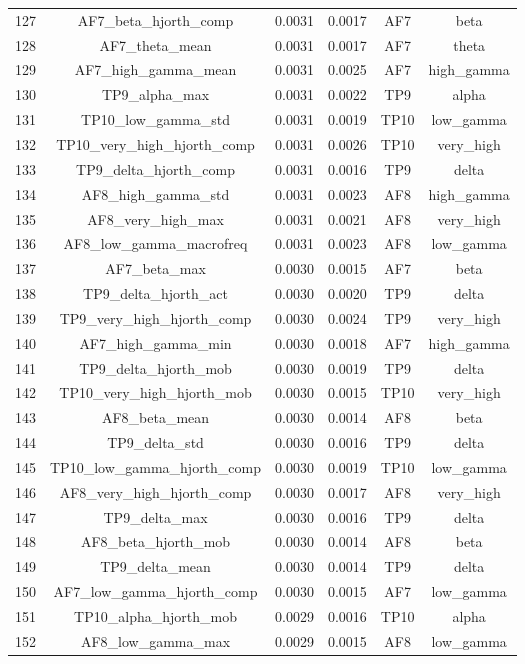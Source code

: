 \begin{table}[hptb]
\begin{table}
\begin{tabular}{cccccc}
127 & AF7_beta_hjorth_comp & 0.0031 & 0.0017 & AF7 & beta \\
128 & AF7_theta_mean & 0.0031 & 0.0017 & AF7 & theta \\
129 & AF7_high_gamma_mean & 0.0031 & 0.0025 & AF7 & high_gamma \\
130 & TP9_alpha_max & 0.0031 & 0.0022 & TP9 & alpha \\
131 & TP10_low_gamma_std & 0.0031 & 0.0019 & TP10 & low_gamma \\
132 & TP10_very_high_hjorth_comp & 0.0031 & 0.0026 & TP10 & very_high \\
133 & TP9_delta_hjorth_comp & 0.0031 & 0.0016 & TP9 & delta \\
134 & AF8_high_gamma_std & 0.0031 & 0.0023 & AF8 & high_gamma \\
135 & AF8_very_high_max & 0.0031 & 0.0021 & AF8 & very_high \\
136 & AF8_low_gamma_macrofreq & 0.0031 & 0.0023 & AF8 & low_gamma \\
137 & AF7_beta_max & 0.0030 & 0.0015 & AF7 & beta \\
138 & TP9_delta_hjorth_act & 0.0030 & 0.0020 & TP9 & delta \\
139 & TP9_very_high_hjorth_comp & 0.0030 & 0.0024 & TP9 & very_high \\
140 & AF7_high_gamma_min & 0.0030 & 0.0018 & AF7 & high_gamma \\
141 & TP9_delta_hjorth_mob & 0.0030 & 0.0019 & TP9 & delta \\
142 & TP10_very_high_hjorth_mob & 0.0030 & 0.0015 & TP10 & very_high \\
143 & AF8_beta_mean & 0.0030 & 0.0014 & AF8 & beta \\
144 & TP9_delta_std & 0.0030 & 0.0016 & TP9 & delta \\
145 & TP10_low_gamma_hjorth_comp & 0.0030 & 0.0019 & TP10 & low_gamma \\
146 & AF8_very_high_hjorth_comp & 0.0030 & 0.0017 & AF8 & very_high \\
147 & TP9_delta_max & 0.0030 & 0.0016 & TP9 & delta \\
148 & AF8_beta_hjorth_mob & 0.0030 & 0.0014 & AF8 & beta \\
149 & TP9_delta_mean & 0.0030 & 0.0014 & TP9 & delta \\
150 & AF7_low_gamma_hjorth_comp & 0.0030 & 0.0015 & AF7 & low_gamma \\
151 & TP10_alpha_hjorth_mob & 0.0029 & 0.0016 & TP10 & alpha \\
152 & AF8_low_gamma_max & 0.0029 & 0.0015 & AF8 & low_gamma \\

\end{tabular}
\end{table}
\end{table}
